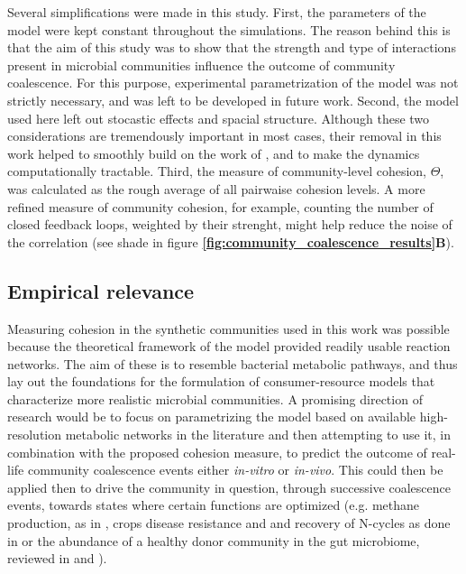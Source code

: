 \documentclass[titlepage,11pt]{article}
\begin{document}
\begin{linenumbers}
\begin{singlespace}
			Several simplifications were made in this study. First, the parameters of the model were kept constant throughout the simulations. The reason behind this is that the aim of this study was to show that the strength and type of interactions present in microbial communities influence the outcome of community coalescence. For this purpose, experimental parametrization of the model was not strictly necessary, and was left to be developed in future work. Second, the model used here left out stocastic effects and spacial structure. Although these two considerations are tremendously important in most cases, their removal in this work helped to smoothly build on the work of \citet{Tikhonov2016}, and to make the dynamics computationally tractable. Third, the measure of community-level cohesion, $ \Theta $, was  calculated as the rough average of all pairwaise cohesion levels. A more refined measure of community cohesion, for example, counting the number of closed feedback loops, weighted by their strenght,  might help reduce the noise of the correlation (see shade in figure \textbf{\ref{fig:community_coalescence_results}B}). %
			\subsection{Empirical relevance}
				Measuring cohesion in the synthetic communities used in this work was possible because the theoretical framework of the model provided readily usable reaction networks. The aim of these is to resemble bacterial metabolic pathways, and thus lay out the foundations for the formulation of consumer-resource models that characterize more realistic microbial communities. A promising direction of research would be to focus on parametrizing the model based on available high-resolution metabolic networks in the literature and then attempting to use it, in combination with the proposed cohesion measure, to predict the outcome of real-life community coalescence events either \textit{in-vitro} or \textit{in-vivo}. This could then be applied then to drive the community in question, through successive coalescence events, towards states where certain functions are optimized (e.g. methane production, as in \citet{Rillig2016}, crops disease resistance and and recovery of N-cycles as done in \citet{Calderon2017} or the abundance of a healthy donor community in the gut microbiome, reviewed in \citet{Wilson2019} and \citet{Wang2019}). 
	

\end{singlespace}
\end{linenumbers}
\end{document}
